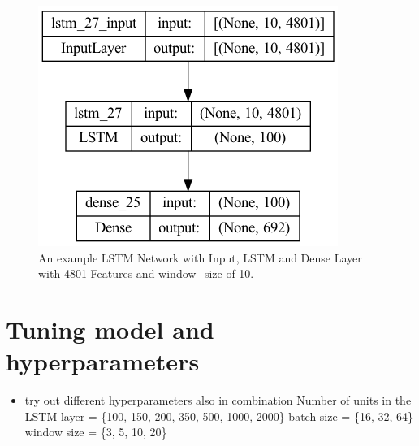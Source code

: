 \begin{figure}[h!]
    \centering
    \includegraphics[scale=0.5]{images/model_plot.png}
    \caption{An example LSTM Network with Input, LSTM and Dense Layer with 4801 Features and window\_size of 10.}
    \label{fig:lstm_architecture}
\end{figure}

\section{Tuning model and hyperparameters}
\begin{itemize}
    \item try out different hyperparameters also in combination
    \subitem Number of units in the LSTM layer = \{100, 150, 200, 350, 500, 1000, 2000\}
    \subitem batch size = \{16, 32, 64\}
    \subitem window size = \{3, 5, 10, 20\}
\end{itemize}

